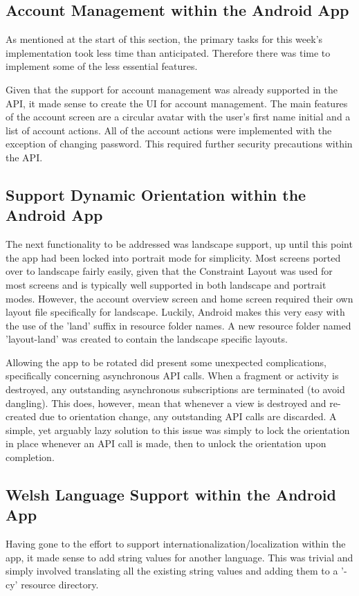 \subsection{Account Management within the Android App}
As mentioned at the start of this section, the primary tasks for this week's implementation took less time than anticipated. Therefore there was time to implement some of the less essential features. 

Given that the support for account management was already supported in the API, it made sense to create the UI for account management. The main features of the account screen are a circular avatar with the user's first name initial and a list of account actions. All of the account actions were implemented with the exception of changing password. This required further security precautions within the API.

\subsection{Support Dynamic Orientation within the Android App}
The next functionality to be addressed was landscape support, up until this point the app had been locked into portrait mode for simplicity. Most screens ported over to landscape fairly easily, given that the Constraint Layout was used for most screens and is typically well supported in both landscape and portrait modes. However, the account overview screen and home screen required their own layout file specifically for landscape. Luckily, Android makes this very easy with the use of the 'land' suffix in resource folder names. A new resource folder named 'layout-land' was created to contain the landscape specific layouts. 

Allowing the app to be rotated did present some unexpected complications,  specifically concerning asynchronous API calls. When a fragment or activity is destroyed, any outstanding asynchronous subscriptions are terminated (to avoid dangling). This does, however, mean that whenever a view is destroyed and re-created due to orientation change, any outstanding API calls are discarded. A simple, yet arguably lazy solution to this issue was simply to lock the orientation in place whenever an API call is made, then to unlock the orientation upon completion.

\subsection{Welsh Language Support within the Android App}
Having gone to the effort to support internationalization/localization within the app, it made sense to add string values for another language. This was trivial and simply involved translating all the existing string values and adding them to a '-cy' resource directory.

